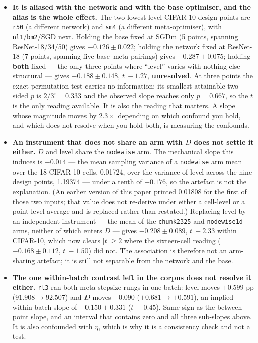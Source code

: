 \documentclass[10pt,letterpaper]{article}
\newcommand{\Dstat}{D}                         %
\newcommand{\arm}[1]{\texttt{#1}}
\begin{document}
\begin{itemize}
\item \textbf{It is aliased with the network and with the base optimiser, and the alias is the
  whole effect.} The two lowest-level CIFAR-10 design points are \arm{r50} (a different network)
  and \arm{sm4} (a different meta-optimiser), with \arm{nl1}/\arm{bm2}/SGD next. Holding the base
  fixed at SGDm (5 points, spanning ResNet-18/34/50) gives $\mathbf{-0.126 \pm 0.022}$; holding
  the network fixed at ResNet-18 (7 points, spanning five base--meta pairings) gives
  $\mathbf{-0.287 \pm 0.075}$; holding \textbf{both} fixed --- the only three points where
  ``level'' varies with nothing else structural --- gives $\mathbf{-0.188 \pm 0.148}$,
  $t\ -1.27$, \textbf{unresolved}. At three points the exact permutation test carries no
  information: its smallest attainable two-sided $p$ is $2/3! = 0.333$ and the observed slope
  reaches only $p = 0.667$, so the $t$ is the only reading available. It is also the reading that
  matters. A slope whose magnitude moves by $2.3\times$ depending on which confound you hold, and
  which does not resolve when you hold both, is measuring the confounds.
\item \textbf{An instrument that does not share an arm with $\Dstat$ does not settle it either.}
  $\Dstat$ and level share the \arm{nodewise} arm. The mechanical slope this induces is
  $\mathbf{-0.014}$ --- the mean sampling variance of a \arm{nodewise} arm mean over the 18
  CIFAR-10 cells, 0.01724, over the variance of level across the nine design points, 1.19374 ---
  under a tenth of $-0.176$, so the artefact is not the explanation. (An earlier version of this paper printed
  0.01808 for the first of those two inputs; that value does not re-derive under either a
  cell-level or a point-level average and is replaced rather than restated.) Replacing level by an
  independent instrument --- the mean of the \arm{chunk2325} and \arm{nodewise1d} arms, neither of
  which enters $\Dstat$ --- gives $\mathbf{-0.208 \pm 0.089}$, $t\ -2.33$ within CIFAR-10, which
  now clears $|t| \ge 2$ where the sixteen-cell reading ($-0.168 \pm 0.112$, $t\ -1.50$) did not.
  The association is therefore not an arm-sharing artefact; it is still not separable from the
  network and the base.
\item \textbf{The one within-batch contrast left in the corpus does not resolve it either.}
  \arm{rl3} ran both meta-stepsize rungs in one batch: level moves $+0.599$ pp
  ($91.908 \rightarrow 92.507$) and $\Dstat$ moves $-0.090$ ($+0.681 \rightarrow +0.591$), an
  implied within-batch slope of $\mathbf{-0.150 \pm 0.331}$ ($t\ -0.45$). Same sign as the
  between-point slope, and an interval that contains zero and all three sub-slopes above. It is
  also confounded with $\eta$, which is why it is a consistency check and not a test.
\end{itemize}
\end{document}
